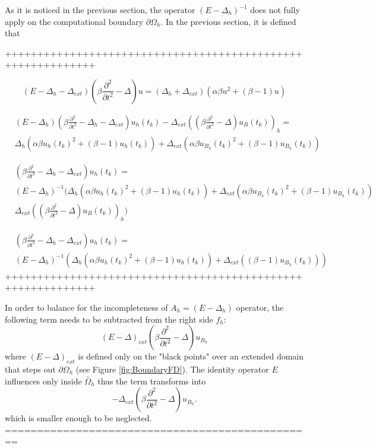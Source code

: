 \documentclass[11pt,a4paper,twoside]{article}
\begin{document}
As it is noticed in the previous section, the operator $(E - \Delta_h)^{-1}$ does not fully apply on the computational boundary $\partial \Omega_h$. In the previous section, it is defined that

++++++++++++++++++++++++++++++++++++++++++++++++++++++++++++

\begin{equation}
(E-\Delta_h -\Delta_{ext})(\beta \frac{ \partial^2 } { \partial t^2 } - \Delta) u =( \Delta_h + \Delta_{ext}) ( \alpha \beta u^2  + (\beta -1)u) 
\end{equation}

\begin{align}
&(E-\Delta_h)(\beta \frac{ \partial^2 } { \partial t^2 } - \Delta_h - \Delta_{ext}) u_h(t_k) - \Delta_{ext}((\beta \frac{ \partial^2 } { \partial t^2 } - \Delta)u_B(t_k))_h = 
\\
&\Delta_h ( \alpha \beta u_h(t_k)^2  + (\beta -1)u_h(t_k)) +  \Delta_{ext} ( \alpha \beta u_{B_h}(t_k)^2  + (\beta -1)u_{B_h}(t_k))  
\end{align}

\begin{align}
&(\beta \frac{ \partial^2 } { \partial t^2 } - \Delta_h - \Delta_{ext}) u_h(t_k)  = 
\\
&(E-\Delta_h)^{-1} ( \Delta_h ( \alpha \beta u_h(t_k)^2  + (\beta -1)u_h(t_k)) +  \Delta_{ext} ( \alpha \beta u_{B_h}(t_k)^2  + (\beta -1)u_{B_h}(t_k))   \nonumber
\\
&\Delta_{ext}((\beta \frac{ \partial^2 } { \partial t^2 } - \Delta)u_B(t_k))_h )
\end{align}

\begin{align}
&(\beta \frac{ \partial^2 } { \partial t^2 } - \Delta_h - \Delta_{ext}) u_h(t_k)  = 
\\
&(E-\Delta_h)^{-1} ( \Delta_h ( \alpha \beta u_h(t_k)^2  + (\beta -1)u_h(t_k)) +  \Delta_{ext} ( (\beta -1) u_{B_h}(t_k))  )
\end{align}
++++++++++++++++++++++++++++++++++++++++++++++++++++++++++++

In order to balance for the incompleteness of $A_h = (E-\Delta_h)$ operator, the following term needs to be subtracted from the right side $f_h$:
\begin{equation*}
(E-\Delta)_{ext}(\beta \frac{ \partial^2 } { \partial t^2 } - \Delta) u_{B_h}
\end{equation*}
where $(E-\Delta)_{ext}$ is defined only on the "black points" over an extended domain that steps out $\partial \Omega_h$ (see Figure \ref{fig:BoundaryFD}). The identity operator $E$ influences only inside $\bar \Omega_h$ thus the term transforms into
\begin{equation*}
-\Delta_{ext}(\beta \frac{ \partial^2 } { \partial t^2 } - \Delta) u_{B_h}.
\end{equation*}
which is smaller enough to be neglected.
================================================
\fi
\end{document}
